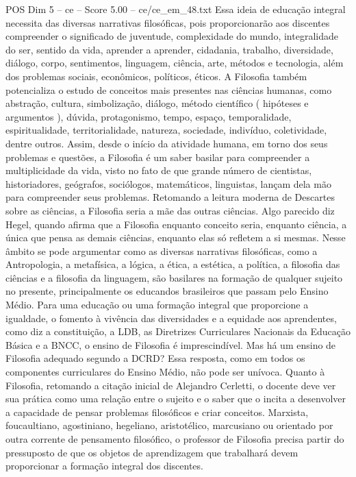 \begin{textsample}{POS Dim 5 – ce – Score 5.00 – ce/ce\_em\_48.txt}
Essa ideia de educação integral necessita das diversas narrativas filosóficas, pois proporcionarão aos discentes compreender o significado de juventude, complexidade do mundo, integralidade do ser, sentido da vida, aprender a aprender, cidadania, trabalho, diversidade, diálogo, corpo, sentimentos, linguagem, ciência, arte, métodos e tecnologia, além dos problemas sociais, econômicos, políticos, éticos.
A Filosofia também potencializa o estudo de conceitos mais presentes nas ciências humanas, como abstração, cultura, simbolização, diálogo, método científico ( hipóteses e argumentos ), dúvida, protagonismo, tempo, espaço, temporalidade, espiritualidade, territorialidade, natureza, sociedade, indivíduo, coletividade, dentre outros.
Assim, desde o início da atividade humana, em torno dos seus problemas e questões, a Filosofia é um saber basilar para compreender a multiplicidade da vida, visto no fato de que grande número de cientistas, historiadores, geógrafos, sociólogos, matemáticos, linguistas, lançam dela mão para compreender seus problemas.
Retomando a leitura moderna de Descartes sobre as ciências, a Filosofia seria a mãe das outras ciências.
Algo parecido diz Hegel, quando afirma que a Filosofia enquanto conceito seria, enquanto ciência, a única que pensa as demais ciências, enquanto elas só refletem a si mesmas.
Nesse âmbito se pode argumentar como as diversas narrativas filosóficas, como a Antropologia, a metafísica, a lógica, a ética, a estética, a política, a filosofia das ciências e a filosofia da linguagem, são basilares na formação de qualquer sujeito no presente, principalmente os educandos brasileiros que passam pelo Ensino Médio.
Para uma educação ou uma formação integral que proporcione a igualdade, o fomento à vivência das diversidades e a equidade aos aprendentes, como diz a constituição, a LDB, as Diretrizes Curriculares Nacionais da Educação Básica e a BNCC, o ensino de Filosofia é imprescindível.
Mas há um ensino de Filosofia adequado segundo a DCRD?
Essa resposta, como em todos os componentes curriculares do Ensino Médio, não pode ser unívoca.
Quanto à Filosofia, retomando a citação inicial de Alejandro Cerletti, o docente deve ver sua prática como uma relação entre o sujeito e o saber que o incita a desenvolver a capacidade de pensar problemas filosóficos e criar conceitos.
Marxista, foucaultiano, agostiniano, hegeliano, aristotélico, marcusiano ou orientado por outra corrente de pensamento filosófico, o professor de Filosofia precisa partir do pressuposto de que os objetos de aprendizagem que trabalhará devem proporcionar a formação integral dos discentes.

\end{textsample}
